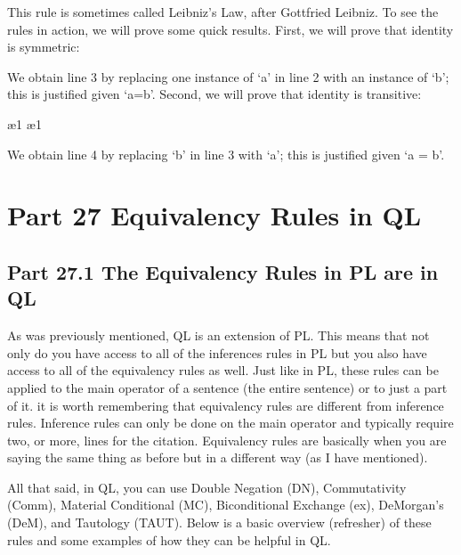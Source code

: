 This rule is sometimes called Leibniz’s Law, after Gottfried Leibniz. To see the rules in action, we will prove some quick results. First, we will prove that identity is symmetric:
\begin{fitchproof}
\open
{}
\ii{}	
\close
{}	
\end{fitchproof}
We obtain line 3 by replacing one instance of ‘a’ in line 2 with an instance of ‘b’; this is justified given ‘a=b’. Second, we will prove that identity is transitive:
\begin{fitchproof}
\open
{}			
\ae{1}
\ae{1}
\close
{}
\end{fitchproof}
We obtain line 4 by replacing ‘b’ in line 3 with ‘a’; this is justified given ‘a = b’.

\leibniz

\chapter{Part 27 Equivalency Rules in QL}
\section{Part 27.1 The Equivalency Rules in PL are in QL}
As was previously mentioned, QL is an extension of PL. This means that not only do you have access to all of the inferences rules in PL but you also have access to all of the equivalency rules as well. Just like in PL, these rules can be applied to the main operator of a sentence (the entire sentence) or to just a part of it. it is worth remembering that equivalency rules are different from inference rules. Inference rules can only be done on the main operator and typically require two, or more, lines for the citation. Equivalency rules are basically when you are saying the same thing as before but in a different way (as I have mentioned). 

All that said, in QL, you can use Double Negation (DN), Commutativity (Comm), Material Conditional (MC), Biconditional Exchange (\eiff ex), DeMorgan's (DeM), and Tautology (TAUT). Below is a basic overview (refresher) of these rules and some examples of how they can be helpful in QL.

